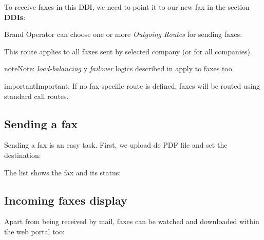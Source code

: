 \documentclass[letterpaper,10pt,english]{sphinxmanual}
\begin{document}
To receive faxes in this DDI, we need to point it to our new fax in the section
\textbf{DDIs}:


Brand Operator can choose one or more \emph{Outgoing Routes} for sending faxes:


This route applies to all faxes sent by selected company (or for all companies).

\begin{notice}{note}{Note:}
\emph{load-balancing} y \emph{failover} logics described in {\hyperref[external_outgoing_calls/call_routing:routes\string-metrics]{}}
apply to faxes too.
\end{notice}

\begin{notice}{important}{Important:}
If no fax-specific route is defined, faxes will be routed using
standard call routes.
\end{notice}


\subsection{Sending a fax}
\label{faxing/index:sending-a-fax}
Sending a fax is an easy task. First, we upload de PDF file and set the destination:


The list shows the fax and its status:



\subsection{Incoming faxes display}
\label{faxing/index:incoming-faxes-display}
Apart from being received by mail, faxes can be watched and downloaded within
the web portal too:
\end{document}
